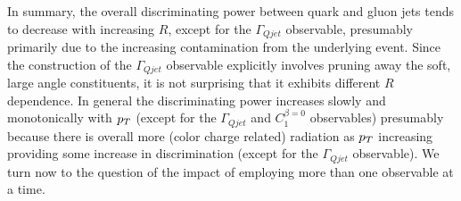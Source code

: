 


In summary, the overall discriminating power between quark and gluon jets tends to
 decrease with increasing $R$, except for the $\Gamma_{Qjet}$ observable, presumably primarily due to the
increasing contamination from the underlying event. Since the construction of the $\Gamma_{Qjet}$ observable explicitly
involves pruning away the soft, large angle constituents, it is not surprising that it exhibits different $R$ dependence. 
In general the discriminating power increases slowly and monotonically
with $p_T$ (except for the $\Gamma_{Qjet}$ and $C_1^{\beta=0}$ observables) presumably because there is overall
more (color charge related) radiation as $p_T$ increasing providing some increase in discrimination (except for the $\Gamma_{Qjet}$ observable).  
We turn now to the question of the
impact of employing more than one observable at a time. 

